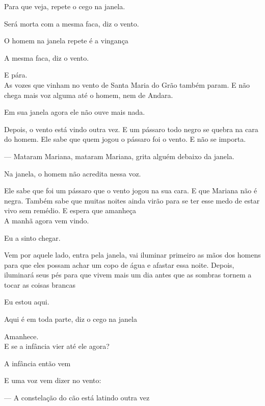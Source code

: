 Para que veja, repete o cego na janela.

Será morta com a mesma faca, diz o vento.

O homem na janela repete é a vingança

A mesma faca, diz o vento.

E pára.\\

As vozes que vinham no vento de Santa Maria do Grão também param. E não
chega mais voz alguma até o homem, nem de Andara.

Em sua janela agora ele não ouve mais nada.

Depois, o vento está vindo outra vez. E um pássaro todo negro se quebra
na cara do homem. Ele sabe que quem jogou o pássaro foi o vento. E não
se importa.

--- Mataram Mariana, mataram Mariana, grita alguém debaixo da janela.

Na janela, o homem não acredita nessa voz.

Ele sabe que foi um pássaro que o vento jogou na sua cara. E que Mariana
não é negra. Também sabe que muitas noites ainda virão para se ter esse
medo de estar vivo sem remédio. E espera que amanheça\\

A manhã agora vem vindo.

Eu a sinto chegar.

Vem por aquele lado, entra pela janela, vai iluminar primeiro as mãos
dos homens para que eles possam achar um copo de água e afastar essa
noite. Depois, iluminará seus pés para que vivem mais um dia antes que
as sombras tornem a tocar as coisas brancas

Eu estou aqui.

Aqui é em toda parte, diz o cego na janela

\breakk

\clearpage
\thispagestyle{empty}

\movetoevenpage

\vspace*{4cm}

Amanhece.\\

E se a infância vier até ele agora?

A infância então vem

E uma voz vem dizer no vento:

--- A constelação do cão está latindo outra vez

\breakk

